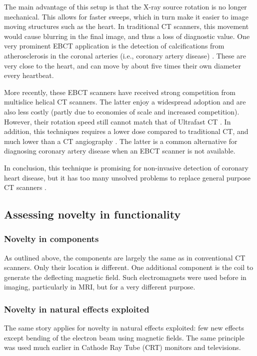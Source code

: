 The main advantage of this setup is that the X-ray source rotation is no longer
mechanical. This allows for faster sweeps, which in turn make it easier to image
moving structures such as the heart. In traditional CT scanners, this movement
would cause blurring in the final image, and thus a loss of diagnostic value.
One very prominent EBCT application is the detection of calcifications from
atherosclerosis in the coronal arteries (i.e., coronary artery disease)
\cite{ultrafastcad}. These are very close to the heart, and can move by about
five times their own diameter every heartbeat.

More recently, these EBCT scanners have received strong competition from
multislice helical CT scanners. The latter enjoy a widespread adoption and are
also less costly (partly due to economies of scale and increased competition).
However, their rotation speed still cannot match that of Ultrafast CT
\cite{ultravshelical}. In addition, this techniques requires a lower dose
compared to traditional CT, and much lower than a CT angiography
\cite{ultralowdose}. The latter is a common alternative for diagnosing coronary
artery disease when an EBCT scanner is not available.

In conclusion, this technique is promising for non-invasive detection of
coronary heart disease, but it has too many unsolved problems to replace general
purpose CT scanners \cite{multictbook}.

\subsection{Assessing novelty in functionality}

\subsubsection{Novelty in components}
As outlined above, the components are largely the same as in conventional CT
scanners. Only their location is different. One additional component is the coil
to generate the deflecting magnetic field. Such electromagnets were used before
in imaging, particularly in MRI, but for a very different purpose.

\subsubsection{Novelty in natural effects exploited}
The same story applies for novelty in natural effects exploited: few new effects
except bending of the electron beam using magnetic fields. The same principle
was used much earlier in Cathode Ray Tube (CRT) monitors and televisions.

